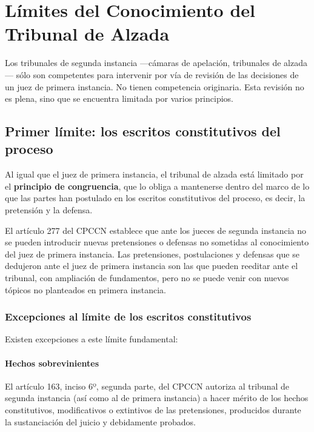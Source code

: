 \documentclass[12pt,oneside]{book}
\begin{document}

\chapter{Límites del Conocimiento del Tribunal de Alzada}

Los tribunales de segunda instancia ---cámaras de apelación, tribunales de alzada--- sólo son competentes para intervenir por vía de revisión de las decisiones de un juez de primera instancia. No tienen competencia originaria. Esta revisión no es plena, sino que se encuentra limitada por varios principios.

\section{Primer límite: los escritos constitutivos del proceso}

Al igual que el juez de primera instancia, el tribunal de alzada está limitado por el \textbf{principio de congruencia}, que lo obliga a mantenerse dentro del marco de lo que las partes han postulado en los escritos constitutivos del proceso, es decir, la pretensión y la defensa.

El artículo 277 del CPCCN establece que ante los jueces de segunda instancia no se pueden introducir nuevas pretensiones o defensas no sometidas al conocimiento del juez de primera instancia. Las pretensiones, postulaciones y defensas que se dedujeron ante el juez de primera instancia son las que pueden reeditar ante el tribunal, con ampliación de fundamentos, pero no se puede venir con nuevos tópicos no planteados en primera instancia.

\subsection{Excepciones al límite de los escritos constitutivos}

Existen excepciones a este límite fundamental:

\subsubsection{Hechos sobrevinientes}

El artículo 163, inciso 6º, segunda parte, del CPCCN autoriza al tribunal de segunda instancia (así como al de primera instancia) a hacer mérito de los hechos constitutivos, modificativos o extintivos de las pretensiones, producidos durante la sustanciación del juicio y debidamente probados.
\end{document}
